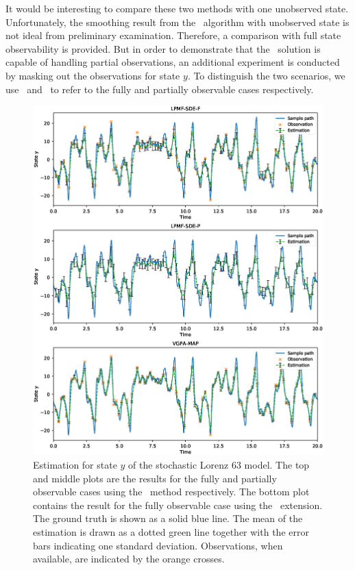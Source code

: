 It would be interesting to compare these two methods with one unobserved state.
Unfortunately, the smoothing result from the \algovgpa\ algorithm with unobserved state is not ideal from preliminary examination.
Therefore, a comparison with full state observability is provided.
But in order to demonstrate that the \algolpmfsde\ solution is capable of handling partial observations, an additional experiment is conducted by masking out the observations for state $y$.
To distinguish the two scenarios, we use \algolpmfsdef\ and  \algolpmfsdep\ to refer to the fully and partially observable cases respectively.

\begin{figure}
    \centering
    \includegraphics[width=\textwidth]{graphics/lorenz-63-states}
    \caption{Estimation for state $y$ of the stochastic Lorenz 63 model. The top and middle plots are the results for the fully and partially observable cases using the \algolpmfsde\ method respectively. The bottom plot contains the result for the fully observable case using the \algovgpamap\ extension. The ground truth is shown as a solid blue line. The mean of the estimation is drawn as a dotted green line together with the error bars indicating one standard deviation. Observations, when available, are indicated by the orange crosses.}
    \label{fig-lorenz-63-states}
\end{figure}


